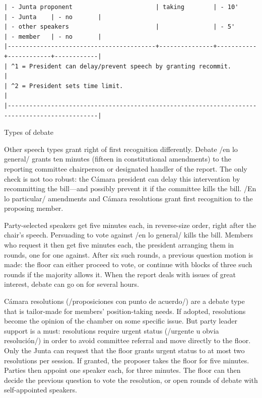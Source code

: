 \documentclass[letter,12pt]{article}
\begin{document}
\begin{table}
\begin{scriptsize}
\begin{verbatim}
| - Junta proponent                       | taking        | - 10'     | - Junta    | - no       |
| - other speakers                        |               | - 5'      | - member   | - no       |
|-----------------------------------------+---------------+-----------+------------+------------|
| ^1 = President can delay/prevent speech by granting recommit.                                 |
| ^2 = President sets time limit.                                                               |
|-----------------------------------------------------------------------------------------------|
\end{verbatim}
  \end{scriptsize}
\caption{Types of debate}\label{T:types}
\end{table}

Other speech types grant right of first recognition differently. Debate /en lo general/ grants ten minutes (fifteen in constitutional amendments) to the reporting committee chairperson or designated handler of the report. The only check is not too robust: the Cámara president can delay this intervention by recommitting the bill---and possibly prevent it if the committee kills the bill. /En lo particular/ amendments and Cámara resolutions grant first recognition to the proposing member.

Party-selected speakers get five minutes each, in reverse-size order, right after the chair's speech. Persuading to vote against /en lo general/ kills the bill. Members who request it then get five minutes each, the president arranging them in rounds, one for one against. After six such rounds, a previous question motion is made: the floor can either proceed to vote, or continue with blocks of three such rounds if the majority allows it. When the report deals with issues of great interest, debate can go on for several hours.

Cámara resolutions (/proposiciones con punto de acuerdo/) are a debate type that is tailor-made for members' position-taking needs. If adopted, resolutions become the opinion of the chamber on some specific issue. But party leader support is a must: resolutions require urgent status (/urgente u obvia resolución/) in order to avoid committee referral and move directly to the floor. Only the Junta can request that the floor grants urgent status to at most two resolutions per session. If granted, the proposer takes the floor for five minutes. Parties then appoint one speaker each, for three minutes. The floor can then decide the previous question to vote the resolution, or open rounds of debate with self-appointed speakers.
\end{document}
